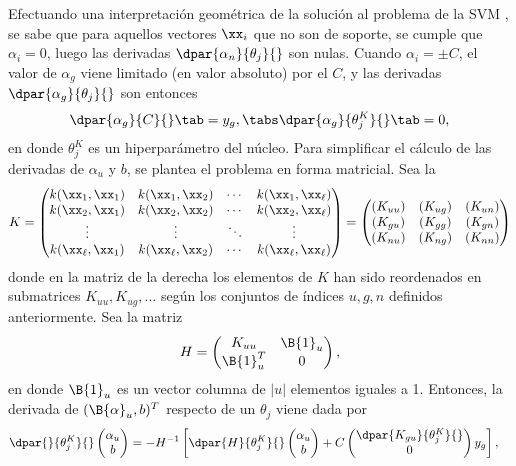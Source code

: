 %
Efectuando una interpretación geométrica de la solución al problema de la
SVM \cite{CITARMODELOSVM}, se sabe que para aquellos vectores $\xx_i$
que no son de soporte, se cumple que $\alpha_i=0$, luego las derivadas
$\dpar{\alpha_n}{\theta_j}{}$ son nulas.
Cuando $\alpha_i=\pm{}C$, el valor de $\alpha_g$ viene limitado (en
valor absoluto) por el \hparam{} $C$, y las derivadas
$\dpar{\alpha_g}{\theta_j}{}$ son entonces
%
\begin{align}
  \dpar{\alpha_g}{C}{} \tab= y_g, \tabs
  \dpar{\alpha_g}{{\theta}^K_j}{} \tab= 0,
\end{align}
%
en donde $\theta_j^K$ es un hiperparámetro del núcleo.
Para simplificar el cálculo de las derivadas de $\alpha_u$ y $b$, se
plantea el problema en forma matricial.
Sea la 
%
\begin{align}
  K = \begin{pmatrix} k(\xx_1,\xx_1) & k(\xx_1,\xx_2) & \cdots & k(\xx_1,\xx_\ell)
    \\ k(\xx_2,\xx_1) & k(\xx_2,\xx_2) & \cdots & k(\xx_2,\xx_\ell) \\ \vdots &
    \vdots & \ddots & \vdots \\ k(\xx_\ell,\xx_1) & k(\xx_\ell,\xx_2) & \cdots &
    k(\xx_\ell,\xx_\ell)
  \end{pmatrix}
  =
  \begin{pmatrix}
    (K_{uu}) & (K_{ug}) & (K_{un}) \\
    (K_{gu}) & (K_{gg}) & (K_{gn}) \\
    (K_{nu}) & (K_{ng}) & (K_{nn})
  \end{pmatrix}
\end{align}
%
donde en la matriz de la derecha los elementos de $K$ han sido
reordenados en submatrices $K_{uu},K_{ug},\ldots$ según los conjuntos
de índices $u, g, n$ definidos anteriormente.
Sea la matriz
%
\begin{align}
  H=\begin{pmatrix} K_{uu} & \B{1}_u \\ \B{1}_u^T & 0
  \end{pmatrix},
\end{align}
%
en donde $\B{1}_u$ es un vector columna de $|u|$ elementos iguales a 1.
Entonces, la derivada de $(\B{\alpha}_u,b)^T$ respecto de un \hparam{}
$\theta_j$ viene dada por
%
\begin{align}
  \dpar{}{\theta^K_j}{} \begin{pmatrix}\alpha_{u}\\b\end{pmatrix} &=
    -H^{-1} \left[
      \dpar{H}{\theta^K_j}{}
      \begin{pmatrix}\alpha_{u}\\b\end{pmatrix}
        +C \begin{pmatrix}\dpar{K_{gu}}{\theta^K_j}{}\\0\end{pmatrix}
          y_g
          \right],
\end{align}
